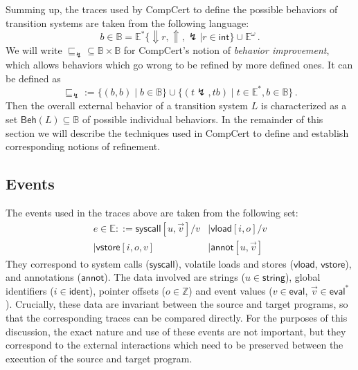 \documentclass[sigplan,10pt,review,anonymous]{acmart}
\newcommand{\kw}[1]{\ensuremath{\mathsf{#1}}}
\newcommand{\refby}{\sqsubseteq}
\begin{document}
Summing up,
the traces used by CompCert to define
the possible behaviors of transition systems
are taken from the following language:
\[
  b \in \mathbb{B} =
    \mathbb{E}^*
      \{ {\Downarrow} r, {\Uparrow}, {\lightning} \mid r \in \kw{int} \}
      \cup
    \mathbb{E}^\omega
  \,.
\]
We will write
${\refby_\lightning} \subseteq \mathbb{B} \times \mathbb{B}$
for CompCert's notion of \emph{behavior improvement},
which allows behaviors which go wrong to
be refined by more defined ones.
It can be defined as
\[
  {\refby_\lightning} := \{ (b, b) \mid b \in \mathbb{B} \}
    \cup \{ (t \lightning, t b) \mid
            t \in \mathbb{E}^*, b \in \mathbb{B} \}
  \,.
\]
Then the overall external behavior
of a transition system $L$
is characterized
as a set $\kw{Beh}(L) \subseteq \mathbb{B}$
of possible individual behaviors.
In the remainder of this section we will describe
the techniques used in CompCert to define and establish
corresponding notions of refinement.



\subsection{Events} %

The events used in the traces above are taken from the following set:
\begin{align*}
  e \in \mathbb{E} ::=
    \kw{syscall}[u, \vec{v}]/v & \mid
    \kw{vload}[i, o]/v \\ \mid
    \kw{vstore}[i, o, v] & \mid
    \kw{annot}[u, \vec{v}]
\end{align*}
They correspond to system calls ($\kw{syscall}$),
volatile loads and stores ($\kw{vload}$, $\kw{vstore}$),
and annotations ($\kw{annot}$).
The data involved
are strings ($u \in \kw{string}$),
global identifiers ($i \in \kw{ident}$),
pointer offsets ($o \in \mathbb{Z}$) and
event values ($v \in \kw{eval}$, $\vec{v} \in \kw{eval}^*$).
Crucially,
these data are invariant between the source and target programs,
so that the corresponding traces can be compared directly.
For the purposes of this discussion,
the exact nature and use of these events
are not important,
but they correspond to the external interactions
which need to be preserved between the execution
of the source and target program.
\end{document}
